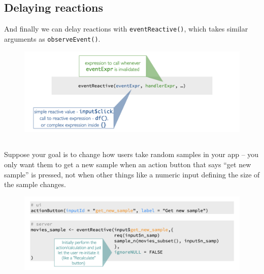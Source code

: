 \documentclass[
  letterpaper,
  DIV=11,
  numbers=noendperiod]{scrreprt}
\begin{document}
\hypertarget{delaying-reactions}{%
\subsection{Delaying reactions}\label{delaying-reactions}}

And finally we can delay reactions with \texttt{eventReactive()}, which
takes similar arguments as \texttt{observeEvent()}.

\begin{figure}

{\centering \includegraphics[width=1\textwidth,height=\textheight]{./images/eventReactive.png}

}

\end{figure}

\hypertarget{section-51}{%
\subsection{}\label{section-51}}

Suppose your goal is to change how users take random samples in your app
-- you only want them to get a new sample when an action button that
says ``get new sample'' is pressed, not when other things like a numeric
input defining the size of the sample changes.

\begin{figure}

{\centering \includegraphics[width=1\textwidth,height=\textheight]{./images/eventReactive-ignoreNULL.png}

}

\end{figure}
\end{document}
